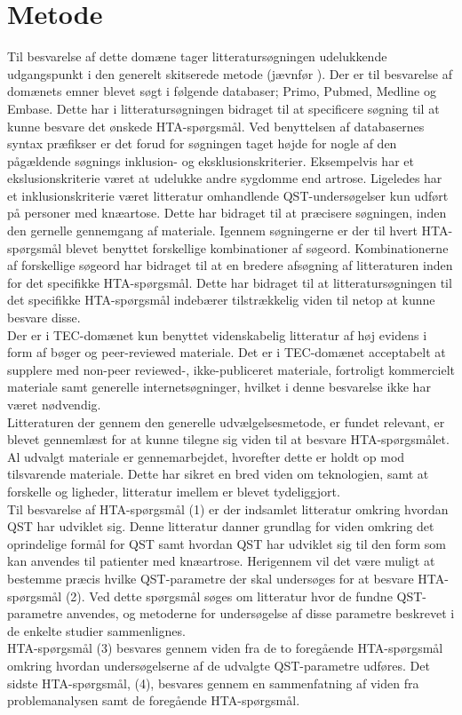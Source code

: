 \section{Metode}
Til besvarelse af dette domæne tager litteratursøgningen udelukkende udgangspunkt i den generelt skitserede metode (jævnfør ). Der er til besvarelse af domænets emner blevet søgt i følgende databaser; Primo, Pubmed, Medline og Embase. Dette har i litteratursøgningen bidraget til at specificere søgning til at kunne besvare det ønskede HTA-spørgsmål. Ved benyttelsen af databasernes syntax præfikser er det forud for søgningen taget højde for nogle af den pågældende søgnings inklusion- og eksklusionskriterier. Eksempelvis har et ekslusionskriterie været at udelukke andre sygdomme end artrose. Ligeledes har et inklusionskriterie været litteratur omhandlende QST-undersøgelser kun udført på personer med knæartose.  Dette har bidraget til at præcisere søgningen, inden den gernelle gennemgang af materiale. Igennem søgningerne er der til hvert HTA-spørgsmål blevet benyttet forskellige kombinationer af søgeord. Kombinationerne af forskellige søgeord har bidraget til at en bredere afsøgning af litteraturen inden for det specifikke HTA-spørgsmål. Dette har bidraget til at litteratursøgningen til det specifikke HTA-spørgsmål indebærer tilstrækkelig viden til netop at kunne besvare disse. \\
Der er i TEC-domænet kun benyttet videnskabelig litteratur af høj evidens i form af bøger og peer-reviewed materiale. Det er i TEC-domænet acceptabelt at supplere med non-peer reviewed-, ikke-publiceret materiale, fortroligt kommercielt materiale samt generelle internetsøgninger, hvilket i denne besvarelse ikke har været nødvendig. \citep{HTAcore} \\
Litteraturen der gennem den generelle udvælgelsesmetode, er fundet relevant, er blevet gennemlæst for at kunne tilegne sig viden til at besvare HTA-spørgsmålet. Al udvalgt materiale er gennemarbejdet, hvorefter dette er holdt op mod tilsvarende materiale. Dette har sikret en bred viden om teknologien, samt at forskelle og ligheder, litteratur imellem er blevet tydeliggjort. \\
Til besvarelse af HTA-spørgsmål (1) er der indsamlet litteratur omkring hvordan QST har udviklet sig. Denne litteratur danner grundlag for viden omkring det oprindelige formål for QST samt hvordan QST har udviklet sig til den form som kan anvendes til patienter med knæartrose. Herigennem vil det være muligt at bestemme præcis hvilke QST-parametre der skal undersøges for at besvare HTA-spørgsmål (2). Ved dette spørgsmål søges om litteratur hvor de fundne QST-parametre anvendes, og metoderne for undersøgelse af disse parametre beskrevet i de enkelte studier sammenlignes. \\
HTA-spørgsmål (3) besvares gennem viden fra de to foregående HTA-spørgsmål omkring hvordan undersøgelserne af de udvalgte QST-parametre udføres. Det sidste HTA-spørgsmål, (4), besvares gennem en sammenfatning af viden fra problemanalysen samt de foregående HTA-spørgsmål.    
 
